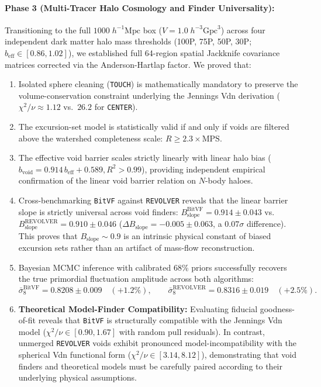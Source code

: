 \documentclass[12pt]{report}
\begin{document}
\paragraph{Phase 3 (Multi-Tracer Halo Cosmology and Finder Universality):} Transitioning to the full $1000\;h^{-1}\mathrm{Mpc}$ box ($V = 1.0\;h^{-3}\mathrm{Gpc}^3$) across four independent dark matter halo mass thresholds (100P, 75P, 50P, 30P; $b_{\mathrm{eff}} \in [0.86, 1.02]$), we established full 64-region spatial Jackknife covariance matrices corrected via the Anderson-Hartlap factor. We proved that:
\begin{enumerate}
    \item Isolated sphere cleaning (\texttt{TOUCH}) is mathematically mandatory to preserve the volume-conservation constraint underlying the Jennings Vdn derivation ($\chi^2/\nu \approx 1.12$ vs.\ $26.2$ for \texttt{CENTER}).
    \item The excursion-set model is statistically valid if and only if voids are filtered above the watershed completeness scale: $R \ge 2.3 \times \mathrm{MPS}$.
    \item The effective void barrier scales strictly linearly with linear halo bias ($b_{\mathrm{void}} = 0.914\,b_{\mathrm{eff}} + 0.589, R^2 > 0.99$), providing independent empirical confirmation of the \citet{Contarini2019} linear void barrier relation on $N$-body haloes.
    \item Cross-benchmarking \texttt{BitVF} against \texttt{REVOLVER} reveals that the linear barrier slope is strictly universal across void finders: $B_{\mathrm{slope}}^{\mathrm{BitVF}} = 0.914 \pm 0.043$ vs.\ $B_{\mathrm{slope}}^{\mathrm{REVOLVER}} = 0.910 \pm 0.046$ ($\Delta B_{\mathrm{slope}} = -0.005 \pm 0.063$, a $0.07\sigma$ difference). This proves that $B_{\mathrm{slope}} \sim 0.9$ is an intrinsic physical constant of biased excursion sets rather than an artifact of mass-flow reconstruction.
    \item Bayesian MCMC inference with calibrated 68\% priors successfully recovers the true primordial fluctuation amplitude across both algorithms:
    \begin{equation}
        \bar{\sigma}_8^{\mathrm{BitVF}} = \mathbf{0.8208 \pm 0.009} \quad (+1.2\%), \qquad \bar{\sigma}_8^{\mathrm{REVOLVER}} = \mathbf{0.8316 \pm 0.019} \quad (+2.5\%).
    \end{equation}
    \item \textbf{Theoretical Model-Finder Compatibility:} Evaluating fiducial goodness-of-fit reveals that \texttt{BitVF} is structurally compatible with the Jennings Vdn model ($\chi^2/\nu \in [0.90, 1.67]$ with random pull residuals). In contrast, unmerged \texttt{REVOLVER} voids exhibit pronounced model-incompatibility with the spherical Vdn functional form ($\chi^2/\nu \in [3.14, 8.12]$), demonstrating that void finders and theoretical models must be carefully paired according to their underlying physical assumptions.

\end{enumerate}
\end{document}
